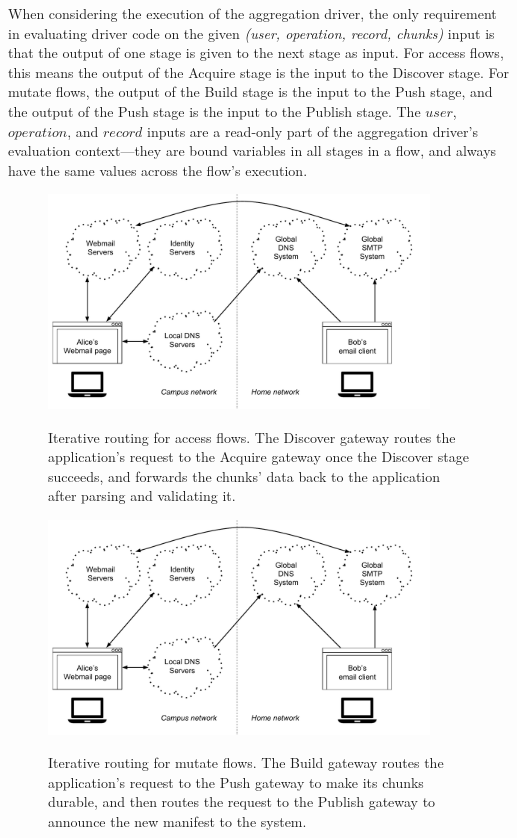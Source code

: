 When considering the execution of the aggregation driver, the only requirement in evaluating
driver code on the given \textit{(user, operation, record, chunks)} input is
that the output of one stage is given to the next stage as input.  For access
flows, this means the output of the Acquire stage is the input to the Discover
stage.  For mutate flows, the output of the Build stage is the input to the Push
stage, and the output of the Push stage is the input to the Publish stage.  The
$user$, $operation$, and $record$ inputs are a read-only part of the aggregation driver's
evaluation context---they are bound variables in all stages in a flow, and
always have the same values across the flow's execution.

\begin{figure}[h!]
   \caption{Iterative routing for access flows.  The Discover gateway routes the
   application's request to the Acquire gateway once the Discover stage
   succeeds, and forwards the chunks' data back to the application after parsing
   and validating it.}
   \centering
   \includegraphics[width=0.9\textwidth,page=9]{figures/dissertation-figures}
   \label{fig:chap2-access-flow-protocol}
\end{figure}

\begin{figure}[h!]
   \caption{Iterative routing for mutate flows.  The Build gateway routes the
   application's request to the Push gateway to make its chunks durable, and
   then routes the request to the Publish gateway to announce the new manifest
   to the system.}
   \centering
   \includegraphics[width=0.9\textwidth,page=10]{figures/dissertation-figures}
   \label{fig:chap2-mutate-flow-protocol}
\end{figure}

